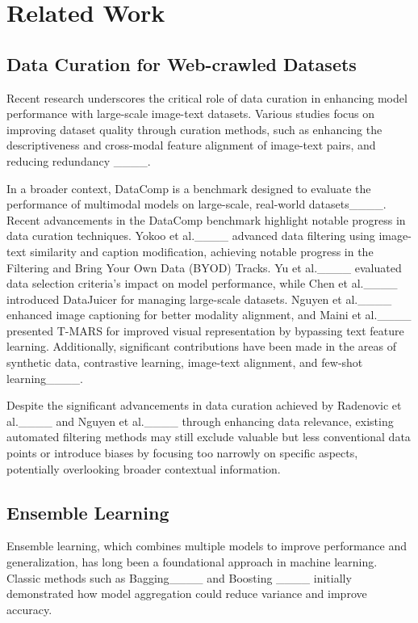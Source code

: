 \section{Related Work}
\label{sec:headings}


\subsection{Data Curation for Web-crawled Datasets}

Recent research underscores the critical role of data curation in enhancing model performance with large-scale image-text datasets. Various studies focus on improving dataset quality through curation methods, such as enhancing the descriptiveness and cross-modal feature alignment of image-text pairs, and reducing redundancy ____.

In a broader context, DataComp is a benchmark designed to evaluate the performance of multimodal models on large-scale, real-world datasets____. Recent advancements in the DataComp benchmark highlight notable progress in data curation techniques. Yokoo et al.____ advanced data filtering using image-text similarity and caption modification, achieving notable progress in the Filtering and Bring Your Own Data (BYOD) Tracks. Yu et al.____ evaluated data selection criteria's impact on model performance, while Chen et al.____ introduced DataJuicer for managing large-scale datasets. Nguyen et al.____ enhanced image captioning for better modality alignment, and Maini et al.____ presented T-MARS for improved visual representation by bypassing text feature learning. Additionally, significant contributions have been made in the areas of synthetic data, contrastive learning, image-text alignment, and few-shot learning____.


Despite the significant advancements in data curation achieved by Radenovic et al.____ and Nguyen et al.____ through enhancing data relevance, existing automated filtering methods may still exclude valuable but less conventional data points or introduce biases by focusing too narrowly on specific aspects, potentially overlooking broader contextual information. 

\subsection{Ensemble Learning}
Ensemble learning, which combines multiple models to improve performance and generalization, has long been a foundational approach in machine learning. Classic methods such as Bagging____ and Boosting ____ initially demonstrated how model aggregation could reduce variance and improve accuracy.

